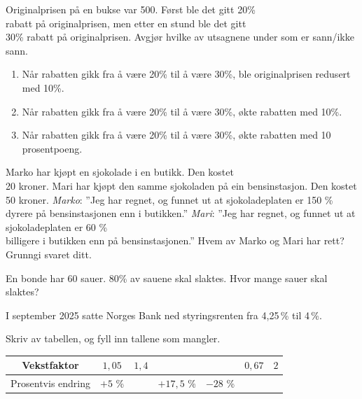 Originalprisen på en bukse var 500. Først ble det gitt 20\% \\ rabatt på originalprisen, men etter en stund ble det gitt\\ 30\% rabatt på originalprisen. Avgjør hvilke av utsagnene under som er sann/ikke sann.
\begin{enumerate}[label=(\roman*)]
	\item Når rabatten gikk fra å være 20\% til å være 30\%, ble originalprisen redusert med 10\%.
	\item Når rabatten gikk fra å være 20\% til å være 30\%, økte rabatten med 10\%.
	\item Når rabatten gikk fra å være 20\% til å være 30\%, økte rabatten med 10 prosentpoeng.	
\end{enumerate}

Marko har kjøpt en sjokolade i en butikk. Den kostet\\ 20 kroner.\os
Mari har kjøpt den samme sjokoladen på ein bensinstasjon. Den kostet 50 kroner.\os
\textit{Marko}: 
''Jeg har regnet, og funnet ut at sjokoladeplaten er
150 \% dyrere på bensinstasjonen enn i butikken.''\os
\textit{Mari}: ''Jeg har regnet, og funnet ut at sjokoladeplaten er 
60 \% \\ billigere i butikken enn på bensinstasjonen.''\os
Hvem av Marko og Mari har rett? Grunngi svaret ditt.

En bonde har 60 sauer. 80\% av sauene skal slaktes.
Hvor mange sauer skal slaktes?

I september 2025 satte Norges Bank ned styringsrenten fra 4{,}25\,\% til
4\,\%.



\nes

Skriv av tabellen, og fyll inn tallene som mangler. \os

\begin{tabular}{|c|c|c|c|c|c|c|}
	\hline
	Vekstfaktor & $1,05$ & $1,4$ & & & $0,67$ & $2$ \\
	\hline
	Prosentvis endring & $+5$ \% & & $+17,5$ \% & $-28$ \% & & \\
	\hline
\end{tabular}

